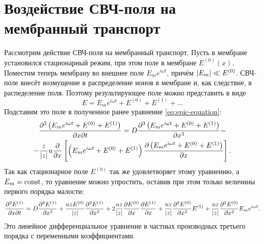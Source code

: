\section{Воздействие СВЧ-поля на мембранный транспорт}

Рассмотрим действие СВЧ-поля на мембранный транспорт. Пусть в мембране
установился стационарный режим, при этом поле в мембране \( E^{(0)}(x) \).
Поместим теперь мембрану во внешнее поле \( E_m e^{i\omega t} \), причём
\( \left| E_m \right| \ll E^{(0)} \). СВЧ-поле внесёт возмущение в распределение
ионов в мембране и, как следствие, в распеделение поля. Поэтому результирующее
поле можно представить в виде
\begin{equation}
    E = E_m e^{i\omega t} + E^{(0)} + E^{(1)} + \ldots
\end{equation}
Подставим это поле в полученное ранее уравнение \eqref{eq:epic-equation}:
\begin{gather*}
    \frac{\partial^2 \left(E_m e^{i\omega t} + E^{(0)} + E^{(1)}\right)}{\partial x \partial t} =
     D\frac{\partial^3
         \left(E_m e^{i\omega t} + E^{(0)} + E^{(1)}\right)
    }{\partial x^3}
     -\\-
    \frac{z}{\left| z \right|}u\frac{\partial }{\partial x}\left[
    \left(E_m e^{i\omega t} + E^{(0)} + E^{(1)}\right)
    \frac{\partial \left(E_m e^{i\omega t} + E^{(0)} + E^{(1)}\right)}{\partial x}\right].
\end{gather*}
Так как стационарное поле \( E^{(0)} \) так же удовлетворяет этому уравнению,
а \( E_m = \mathrm{const} \), то уравнение можно упростить, оставив при этом только
величины первого порядка малости:
\begin{equation}
    \frac{\partial^2 E^{(1)}}{\partial x \partial t} = D\frac{\partial^3 E^{(1)}}{\partial x^3} +
    \frac{uzE^{(0)}}{\left| z \right|}\frac{\partial^2 E^{(1)}}{\partial {x}^2} +
    2\frac{uz}{\left| z \right|}\frac{\partial E^{(0)}}{\partial x}\frac{\partial E^{(1)}}{\partial x} +
    \frac{uz}{\left| z \right|}\frac{\partial^2 E^{(0)}}{\partial {x}^2} E^{(1)} +
    \frac{uz}{\left| z \right|}\frac{\partial^2 E^{(0)}}{\partial {x}^2} E_m e^{i\omega t}.
\end{equation}
Это линейное дифференциальное уравнение в частных производных третьего порядка с
переменными коэффициентами.
